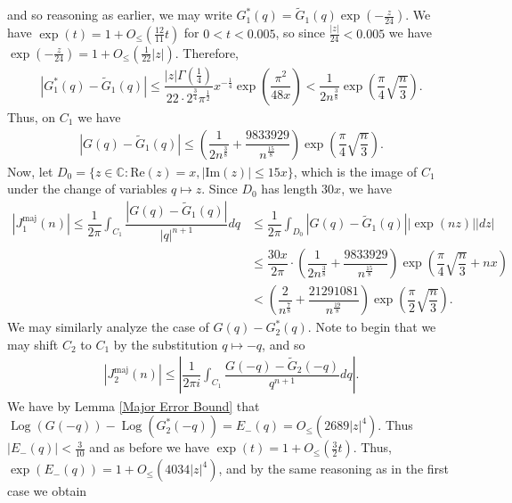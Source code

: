 \documentclass[11pt,reqno]{amsart}
\theoremstyle{definition}
\theoremstyle{plain}
\theoremstyle{named}
\newcommand{\C}{\mathbb{C}}
\DeclareMathOperator\Log{Log}
\numberwithin{equation}{section}
\theoremstyle{example}
\def\lp{\left(}
\def\rp{\right)}
\begin{document}
and so reasoning as earlier, we may write $G_1^*(q) = \widetilde{G}_1(q) \exp\lp -\frac{z}{24} \rp$. We have $\exp\lp t \rp = 1 + O_{\leq}\lp \frac{12}{11} t \rp$ for $0 < t < 0.005$, so since $\frac{|z|}{24} < 0.005$ we have $\exp\lp -\frac{z}{24} \rp = 1 + O_{\leq}\lp \frac{1}{22} |z| \rp$. Therefore,
\begin{align*}
	\left|G_1^*(q) - \widetilde{G}_1(q)\right| \leq \dfrac{|z|\Gamma\lp \frac 14 \rp}{22 \cdot 2^{\frac 34} \pi^{\frac 12}} x^{- \frac 14} \exp\lp \dfrac{\pi^2}{48x} \rp < \dfrac{1}{2 n^{\frac 38}} \exp\lp \dfrac{\pi}{4} \sqrt{\dfrac{n}{3}} \rp.
\end{align*}
Thus, on $C_1$ we have
\begin{align*}
	\left|G(q) -\widetilde{G}_1(q)\right| \leq \lp \dfrac{1}{2 n^{\frac 38}} + \dfrac{9833929}{n^{\frac{15}{8}}} \rp \exp\lp \dfrac{\pi}{4} \sqrt{\dfrac{n}{3}} \rp.
\end{align*}
Now, let $D_0 = \{ z\in \C : \mathrm{Re}\lp z \rp = x, \left| \mathrm{Im}\lp z \rp \right| \leq 15 x \}$, which is the image of $C_1$ under the change of variables $q \mapsto z$. Since $D_0$ has length $30x$, we have
\begin{align*}
	\left|J_1^{\text{maj}}(n)\right| \leq \dfrac{1}{2\pi} \int_{C_1} \dfrac{\left| G(q) - \widetilde{G}_1(q) \right|}{|q|^{n+1}} dq &\leq \dfrac{1}{2\pi} \int_{D_0} \left| G(q) -  \widetilde{G}_1(q) \right| \left| \exp\lp nz \rp \right| |dz| \\ &\leq \dfrac{30x}{2\pi} \cdot \lp \dfrac{1}{2 n^{\frac 38}} + \dfrac{9833929}{n^{\frac{15}{8}}} \rp \exp\lp \dfrac{\pi}{4} \sqrt{\dfrac{n}{3}} + nx \rp \\ &< \lp \dfrac{2}{n^{\frac{7}{8}}} + \dfrac{21291081}{n^{\frac{19}{8}}} \rp \exp\lp \dfrac{\pi}{2} \sqrt{\dfrac{n}{3}} \rp.
\end{align*}
We may similarly analyze the case of $G(q) - G_2^*(q)$. Note to begin that we may shift $C_2$ to $C_1$ by the substitution $q \mapsto -q$, and so
\begin{align*}
	\left|J^{\text{maj}}_2(n)\right| \leq \left| \dfrac{1}{2\pi i} \int_{C_1} \dfrac{G(-q) - \widetilde{G}_2(-q)}{q^{n+1}} dq \right|.
\end{align*}
We have by Lemma \ref{Major Error Bound} that $\Log\lp G(-q) \rp - \Log\lp G_2^*(-q) \rp = E_-(q) = O_{\leq}\lp 2689 |z|^4 \rp$. Thus $\left|E_-(q)\right| < \frac{3}{10}$ and as before we have $\exp\lp t \rp = 1 + O_{\leq} \lp \frac{3}{2}t \rp$. Thus, $\exp\lp E_-(q) \rp = 1 + O_{\leq}\lp 4034 |z|^4 \rp$, and by the same reasoning as in the first case we obtain
\end{document}
